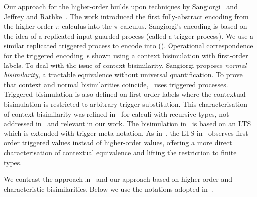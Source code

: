 Our approach for the higher-order builds upon techniques by Sangiorgi~\cite{SangiorgiD:expmpa,San96H}
and Jeffrey and Rathke~\cite{JeffreyR05}.
The work %
\cite{SangiorgiD:expmpa}
introduced the first fully-abstract encoding from the higher-order 
$\pi$-calculus into the $\pi$-calculus. 
Sangiorgi's encoding is based on the idea of a replicated input-guarded process 
(called a trigger process). We use a similar 
replicated triggered process 
to encode \HOp into \sessp ().
 Operational correspondence for
the triggered encoding is shown using a context bisimulation
with first-order labels.
To deal with the issue of context bisimilarity, 
Sangiorgi proposes \emph{normal bisimilarity}, 
a tractable  equivalence without universal quantification. 
To prove that context and normal bisimilarities coincide,~\cite{SangiorgiD:expmpa} uses 
triggered processes.
Triggered bisimulation is also defined on first-order labels
where the contextual bisimulation is restricted to arbitrary
trigger substitution. %
This
characterisation of context bisimilarity  was refined in~\cite{JeffreyR05} for
calculi with recursive types, not addressed in~\cite{San96H,SangiorgiD:expmpa} and
relevant in our work.
The
bisimulation in~\cite{JeffreyR05}
is based on an LTS which is extended with trigger meta-notation.
As in~\cite{San96H,SangiorgiD:expmpa}, 
the LTS in~\cite{JeffreyR05}
observes first-order triggered values instead of
higher-order values, offering a more direct characterisation of contextual equivalence
and lifting the restriction to finite types.

We contrast 
the approach in~\cite{JeffreyR05} and our approach based on 
higher-order and characteristic bisimilarities. 
Below we use the notations adopted in~\cite{JeffreyR05}.
 
